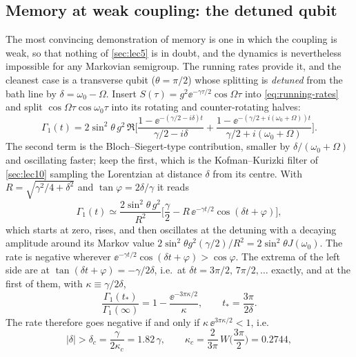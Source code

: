 \subsection{Memory at weak coupling: the detuned qubit}
\label{sec:memory-weak}

The most convincing demonstration of memory is one in which the coupling is weak, so that nothing of \cref{sec:lec5} is in doubt, and the dynamics is nevertheless impossible for any Markovian semigroup.
The running rates provide it, and the cleanest case is a transverse qubit ($\theta=\pi/2$) whose splitting is \emph{detuned} from the bath line by $\delta=\omega_0-\Omega$.
Insert $S(\tau)=g^2\ee^{-\gamma\tau/2}\cos\Omega\tau$ into \cref{eq:running-rates} and split $\cos\Omega\tau\cos\omega_0\tau$ into its rotating and counter-rotating halves:
\begin{equation}
  \Gamma_1(t)=2\sin^2\theta\,g^2\,\Re\bigg[\frac{1-\ee^{-(\gamma/2-i\delta)t}}{\gamma/2-i\delta}+\frac{1-\ee^{-(\gamma/2+i(\omega_0+\Omega))t}}{\gamma/2+i(\omega_0+\Omega)}\bigg].
  \label{eq:rate-detuned}
\end{equation}
The second term is the Bloch--Siegert-type contribution, smaller by $\delta/(\omega_0+\Omega)$ and oscillating faster; keep the first, which is the Kofman--Kurizki filter of \cref{sec:lec10} sampling the Lorentzian at distance $\delta$ from its centre.
With $R=\sqrt{\gamma^2/4+\delta^2}$ and $\tan\varphi=2\delta/\gamma$ it reads
\begin{equation}
  \Gamma_1(t)\simeq\frac{2\sin^2\theta\,g^2}{R^2}\Big[\frac\gamma2-R\,\ee^{-\gamma t/2}\cos(\delta t+\varphi)\Big],
  \label{eq:rate-rwa}
\end{equation}
which starts at zero, rises, and then oscillates at the detuning with a decaying amplitude around its Markov value $2\sin^2\theta g^2(\gamma/2)/R^2=2\sin^2\theta J(\omega_0)$.
The rate is negative wherever $\ee^{-\gamma t/2}\cos(\delta t+\varphi)>\cos\varphi$.
The extrema of the left side are at $\tan(\delta t+\varphi)=-\gamma/2\delta$, i.e.\ at $\delta t=3\pi/2,\,7\pi/2,\dots$ exactly, and at the first of them, with $\kappa\equiv\gamma/2\delta$,
\begin{equation}
  \frac{\Gamma_1(t_*)}{\Gamma_1(\infty)}=1-\frac{\ee^{-3\pi\kappa/2}}{\kappa},\qquad t_*=\frac{3\pi}{2\delta}.
  \label{eq:dip-depth}
\end{equation}
The rate therefore goes negative if and only if $\kappa\,\ee^{3\pi\kappa/2}<1$, i.e.
\begin{equation}
  \boxed{\;|\delta|>\delta_c=\frac{\gamma}{2\kappa_c}=1.82\,\gamma,\qquad \kappa_c=\frac{2}{3\pi}\,W\!\Big(\frac{3\pi}{2}\Big)=0.2744,\;}
  \label{eq:memory-threshold}
\end{equation}
